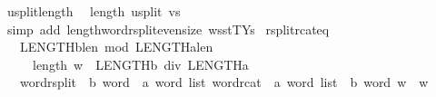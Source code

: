 \begin{isabellebody}
\isanewline
{}\isamarkupfalse%
\ u{}{}{\isacharunderscore}{\kern0pt}split{\isacharunderscore}{\kern0pt}length{\isacharcolon}{\kern0pt}\isanewline
\ \ {\isachardoublequoteopen}length\ {\isacharparenleft}{\kern0pt}u{}{}{\isacharunderscore}{\kern0pt}split\ vs{\isacharparenright}{\kern0pt}\ {\isacharequal}{\kern0pt}\ {}{\isachardoublequoteclose}\isanewline
%
\isadelimproof
\ \ %
\endisadelimproof
%
\isatagproof
{}\isamarkupfalse%
\ {\isacharparenleft}{\kern0pt}simp\ add{\isacharcolon}{\kern0pt}\ length{\isacharunderscore}{\kern0pt}word{\isacharunderscore}{\kern0pt}rsplit{\isacharunderscore}{\kern0pt}even{\isacharunderscore}{\kern0pt}size\ wsst{\isacharunderscore}{\kern0pt}TYs{\isacharparenleft}{\kern0pt}{}{\isacharparenright}{\kern0pt}{\isacharparenright}{\kern0pt}%
\endisatagproof
{\isafoldproof}%
%
\isadelimproof
\isanewline
%
\endisadelimproof
\isanewline
{}\isamarkupfalse%
\ rsplit{\isacharunderscore}{\kern0pt}rcat{\isacharunderscore}{\kern0pt}eq{\isacharcolon}{\kern0pt}\isanewline
\ \ \ {\isachardoublequoteopen}LENGTH{\isacharparenleft}{\kern0pt}{\isacharparenleft}{\kern0pt}{\isacharprime}{\kern0pt}b{\isacharcolon}{\kern0pt}{\isacharcolon}{\kern0pt}len{\isacharparenright}{\kern0pt}{\isacharparenright}{\kern0pt}\ mod\ LENGTH{\isacharparenleft}{\kern0pt}{\isacharparenleft}{\kern0pt}{\isacharprime}{\kern0pt}a{\isacharcolon}{\kern0pt}{\isacharcolon}{\kern0pt}len{\isacharparenright}{\kern0pt}{\isacharparenright}{\kern0pt}\ {\isacharequal}{\kern0pt}\ {}{\isachardoublequoteclose}\isanewline
\ \ \ \ \ {\isachardoublequoteopen}length\ w\ {\isacharequal}{\kern0pt}\ LENGTH{\isacharparenleft}{\kern0pt}{\isacharprime}{\kern0pt}b{\isacharparenright}{\kern0pt}\ div\ LENGTH{\isacharparenleft}{\kern0pt}{\isacharprime}{\kern0pt}a{\isacharparenright}{\kern0pt}{\isachardoublequoteclose}\isanewline
\ \ \ {\isachardoublequoteopen}{\isacharparenleft}{\kern0pt}word{\isacharunderscore}{\kern0pt}rsplit\ {\isacharcolon}{\kern0pt}{\isacharcolon}{\kern0pt}\ {\isacharprime}{\kern0pt}b\ word\ {\isasymRightarrow}\ {\isacharprime}{\kern0pt}a\ word\ list{\isacharparenright}{\kern0pt}\ {\isacharparenleft}{\kern0pt}{\isacharparenleft}{\kern0pt}word{\isacharunderscore}{\kern0pt}rcat\ {\isacharcolon}{\kern0pt}{\isacharcolon}{\kern0pt}\ {\isacharprime}{\kern0pt}a\ word\ list\ {\isasymRightarrow}\ {\isacharprime}{\kern0pt}b\ word{\isacharparenright}{\kern0pt}\ w{\isacharparenright}{\kern0pt}\ {\isacharequal}{\kern0pt}\ w{\isachardoublequoteclose}\isanewline

\end{isabellebody}
